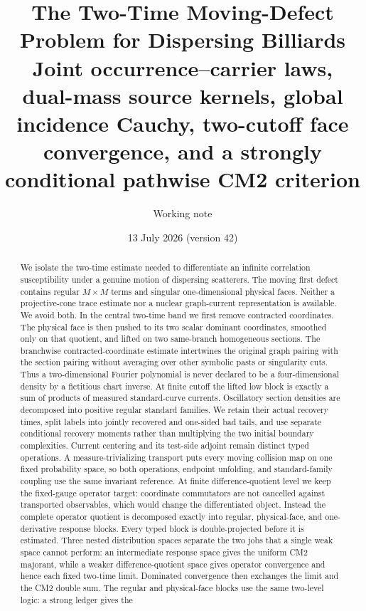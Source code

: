 \documentclass[11pt]{article}
\title{The Two-Time Moving-Defect Problem for Dispersing Billiards\\
\large Joint occurrence--carrier laws, dual-mass source kernels,
global incidence Cauchy,
two-cutoff face convergence, and a strongly conditional
pathwise CM2 criterion}
\author{Working note}
\date{13 July 2026 (version 42)}
\begin{document}
\maketitle

\begin{abstract}
We isolate the two-time estimate needed to differentiate an infinite
correlation susceptibility under a genuine motion of dispersing scatterers.
The moving first defect contains regular $M\times M$ terms and singular
one-dimensional physical faces.  Neither a projective-cone trace estimate nor
a nuclear graph-current representation is available.  We avoid both.  In the
central two-time band we first remove contracted coordinates.  The physical
face is then pushed to its two scalar dominant coordinates, smoothed only on
that quotient, and lifted on two same-branch homogeneous sections.  The
branchwise contracted-coordinate estimate intertwines the original graph
pairing with the section pairing without averaging over other symbolic pasts
or singularity cuts.  Thus a two-dimensional Fourier polynomial is never
declared to be a four-dimensional density by a fictitious chart inverse.  At
finite cutoff the lifted low block is exactly a sum of products of measured
standard-curve currents.  Oscillatory section densities are decomposed into
positive regular standard families.  We retain their actual recovery times,
split labels into jointly recovered and one-sided bad tails, and use separate
conditional recovery moments rather than multiplying the two initial boundary
complexities.  Current centering and its test-side adjoint remain
distinct typed operations.  A measure-trivializing transport puts every
moving collision map on one fixed probability space, so both operations,
endpoint unfolding, and standard-family coupling use the same invariant
reference.  At finite difference-quotient level we keep the fixed-gauge
operator target: coordinate commutators are not cancelled against transported
observables, which would change the differentiated object.  Instead the
complete operator quotient is decomposed exactly into regular, physical-face,
and one-derivative response blocks.  Every typed block is double-projected
before it is estimated.  Three nested distribution spaces separate the two
jobs that a single weak space cannot perform: an intermediate response space
gives the uniform CM2 majorant, while a weaker difference-quotient space gives
operator convergence and hence each fixed two-time limit.  Dominated
convergence then exchanges the limit and the CM2 double sum.  The regular and
physical-face blocks use the same two-level logic: a strong ledger gives the

\end{abstract}
\end{document}
